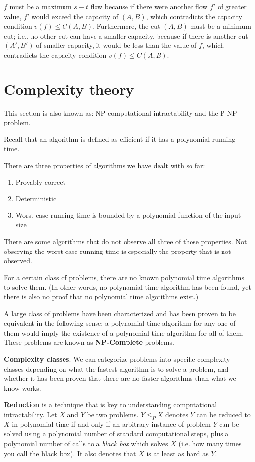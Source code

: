 \documentclass{article}
\begin{document}
$f$ must be a maximum $s-t$ flow because if there were another flow $f'$ of greater value, $f'$ would exceed the capacity of $(A, B)$, which contradicts the capacity condition $v(f) \leq C(A, B)$. Furthermore, the cut $(A, B)$ must be a minimum cut; i.e., no other cut can have a smaller capacity, because if there is another cut $(A', B')$ of smaller capacity, it would be less than the value of $f$, which contradicts the capacity condition $v(f) \leq C(A, B)$.

\section{Complexity theory}
This section is also known as: NP-computational intractability and the P-NP problem.

Recall that an algorithm is defined as efficient if it has a polynomial running time.

There are three properties of algorithms we have dealt with so far:
\begin{enumerate}
    \item Provably correct
    \item Deterministic
    \item Worst case running time is bounded by a polynomial function of the input size
\end{enumerate}

There are some algorithms that do not observe all three of those properties. Not observing the worst case running time is especially the property that is not observed.

For a certain class of problems, there are no known polynomial time algorithms to solve them. (In other words, no polynomial time algorithm has been found, yet there is also no proof that no polynomial time algorithms exist.)

A large class of problems have been characterized and has been proven to be equivalent in the following sense: a polynomial-time algorithm for any one of them would imply the existence of a polynomial-time algorithm for all of them. These problems are known as \textbf{NP-Complete} problems.

\textbf{Complexity classes}. We can categorize problems into specific complexity classes depending on what the fastest algorithm is to solve a problem, and whether it has been proven that there are no faster algorithms than what we know works.

\textbf{Reduction} is a technique that is key to understanding computational intractability. Let $X$ and $Y$ be two problems. $Y \leq_{P} X$ denotes $Y$ can be reduced to $X$ in polynomial time if and only if an arbitrary instance of problem $Y$ can be solved using a polynomial number of standard computational steps, plus a polynomial number of calls to a \textit{black box} which solves $X$ (i.e. how many times you call the black box). It also denotes that $X$ is at least as hard as $Y$. 
\end{document}
